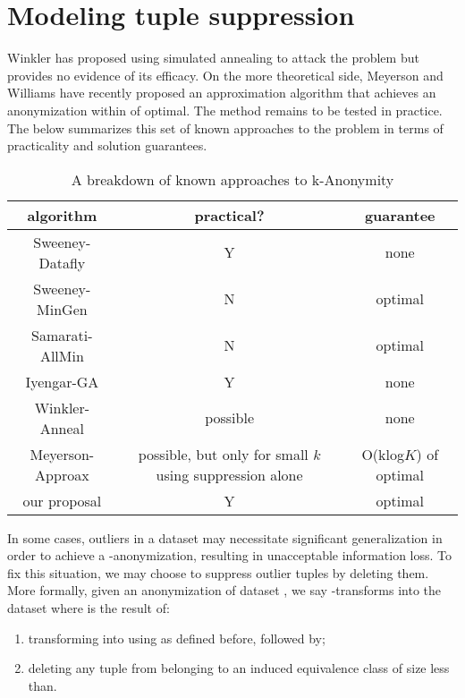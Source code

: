 \documentclass[]{seismica}
\begin{document}
\tableofcontents
\newpage
    
	\section{Modeling tuple suppression}
	
	Winkler has proposed using simulated annealing to attack the problem but provides no evidence of its efficacy. On the more theoretical side, Meyerson and Williams have recently proposed an approximation algorithm that achieves an anonymization within of optimal. The method remains to be tested in practice. The  below summarizes this set of known approaches    to the problem in terms of practicality and solution guarantees.

\begin{table}[ht!]
  \begin{tabular}{|c|c|c|}
    \hline
    algorithm & practical? & guarantee\\
    \hline
    Sweeney-Datafly & Y & none\\
    \hline
    Sweeney-MinGen & N & optimal\\
    \hline
    Samarati-AllMin & N & optimal\\
    \hline
    Iyengar-GA & Y & none\\
    \hline
    Winkler-Anneal & possible & none\\
    \hline
    Meyerson-Approax & possible, but only for small $k$ using suppression alone & O(klog$K$) of optimal\\
    \hline
    our proposal & Y & optimal\\
    \hline
    
  \end{tabular}
  \caption{A breakdown of known approaches to k-Anonymity}
  \label{tab:1}
\end{table}

In some cases, outliers in a dataset may necessitate significant generalization in order to achieve a -anonymization, resulting in unacceptable information loss. To fix this situation, we may choose to suppress outlier tuples by deleting them. More formally, given an anonymization of dataset , we say -transforms into the dataset where is the result of:

   \begin{enumerate}
       \item transforming into using as defined before, followed by;
       \item deleting any tuple from belonging to an induced equivalence class of size less than.
   \end{enumerate}
\end{document}
